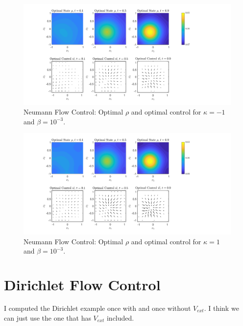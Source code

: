 \documentclass[11pt, a4paper]{article}
\theoremstyle{definition}
\begin{document}
	\begin{figure}[h]
		\centering
		\includegraphics[scale=0.35]{FcEx1kn1.png}
		\caption{Neumann Flow Control: Optimal $\rho$ and optimal control for $\kappa = -1$ and $\beta = 10^{-3}$.} 
		\label{F3b}
	\end{figure}
	\begin{figure}[h]
		\centering
		\includegraphics[scale=0.35]{FcEx1k1.png}
		\caption{Neumann Flow Control: Optimal $\rho$ and optimal control for $\kappa = 1$ and $\beta = 10^{-3}$.} 
		\label{F3c}
	\end{figure}
	
	\section{Dirichlet Flow Control}
	I computed the Dirichlet example once with and once without $V_{ext}$. I think we can just use the one that has $V_{ext}$ included.
\end{document}
